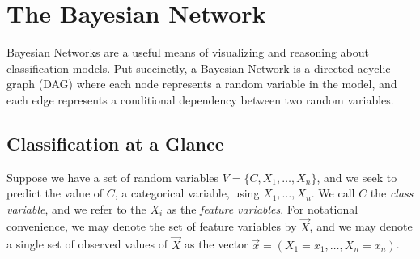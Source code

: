 \documentclass[12pt,twoside]{reedthesis}
\begin{document}
    \chapter{The Bayesian Network}

    	Bayesian Networks are a useful means of visualizing and reasoning about classification models. Put succinctly, a Bayesian Network is a directed acyclic graph (DAG) where each node represents a random variable in the model, and each edge represents a conditional dependency between two random variables.

	\section{Classification at a Glance}

	Suppose we have a set of random variables $V = \{C, X_1, \ldots, X_n\}$, and we seek to predict the value of $C$, a categorical variable, using $X_1, \ldots, X_n$. We call $C$ the {\em class variable}, and we refer to the $X_i$ as the {\em feature variables}. For notational convenience, we may denote the set of feature variables by $\vec{X}$, and we may denote a single set of observed values of $\vec{X}$ as the vector $\vec{x} = (X_1 = x_1, \ldots, X_n = x_n)$.
\end{document}
